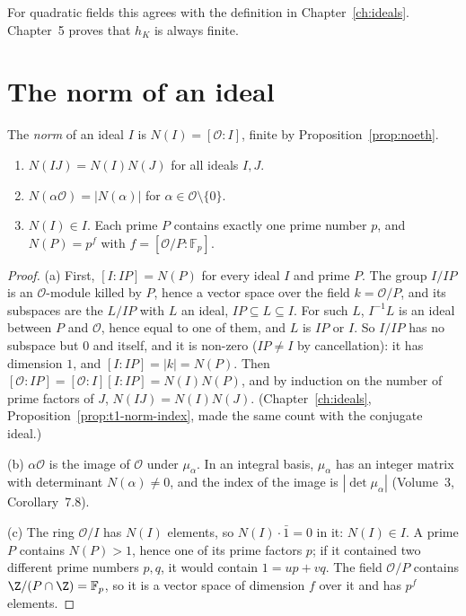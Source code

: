 For quadratic fields this agrees with the definition in Chapter~\ref{ch:ideals}. Chapter~5 proves that $h_K$ is
always finite.

\section{The norm of an ideal}

\begin{definition}
The \emph{norm} of an ideal $I$ is $N(I)=[\mathcal O:I]$, finite by Proposition~\ref{prop:noeth}.
\end{definition}

\begin{proposition}\label{prop:normideal}
\begin{enumerate}[label=(\alph*)]
\item $N(IJ)=N(I)N(J)$ for all ideals $I,J$.
\item $N(\alpha\mathcal O)=|N(\alpha)|$ for $\alpha\in\mathcal O\setminus\{0\}$.
\item $N(I)\in I$. Each prime $P$ contains exactly one prime number $p$, and $N(P)=p^f$ with $f=[\mathcal O/P:\mathbb F_p]$.
\end{enumerate}
\end{proposition}
\begin{proof}
(a) First, $[I:IP]=N(P)$ for every ideal $I$ and prime $P$. The group $I/IP$ is an $\mathcal O$-module killed by $P$,
hence a vector space over the field $k=\mathcal O/P$, and its subspaces are the $L/IP$ with $L$ an ideal, $IP\subseteq
L\subseteq I$. For such $L$, $I^{-1}L$ is an ideal between $P$ and $\mathcal O$, hence equal to one of them, and $L$ is
$IP$ or $I$. So $I/IP$ has no subspace but $0$ and itself, and it is non-zero ($IP\ne I$ by cancellation): it has
dimension $1$, and $[I:IP]=|k|=N(P)$. Then $[\mathcal O:IP]=[\mathcal O:I][I:IP]=N(I)N(P)$, and by induction on the
number of prime factors of $J$, $N(IJ)=N(I)N(J)$. (Chapter~\ref{ch:ideals}, Proposition~\ref{prop:t1-norm-index}, made the same count with
the conjugate ideal.)

(b) $\alpha\mathcal O$ is the image of $\mathcal O$ under $\mu_\alpha$. In an integral basis, $\mu_\alpha$ has an integer
matrix with determinant $N(\alpha)\ne0$, and the index of the image is $|\det\mu_\alpha|$ (Volume~3, Corollary~7.8).

(c) The ring $\mathcal O/I$ has $N(I)$ elements, so $N(I)\cdot\bar1=0$ in it: $N(I)\in I$. A prime $P$ contains
$N(P)>1$, hence one of its prime factors $p$; if it contained two different prime numbers $p,q$, it would contain
$1=up+vq$. The field $\mathcal O/P$ contains $\Z/(P\cap\Z)=\mathbb F_p$, so it is a vector space of dimension
$f$ over it and has $p^f$ elements.
\end{proof}


